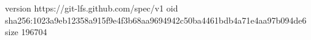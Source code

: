 version https://git-lfs.github.com/spec/v1
oid sha256:1023a9eb12358a915f9e4f3b68aa9694942c50ba4461bdb4a71e4aa97b094de6
size 196704
